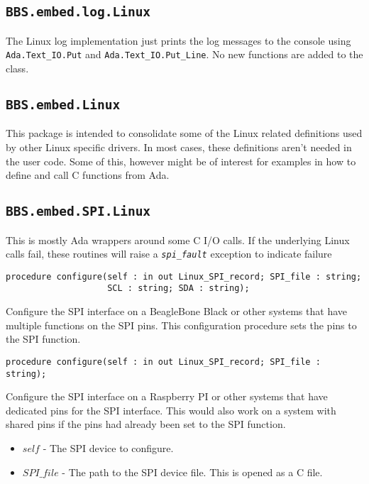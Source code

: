 \documentclass[10pt, openany]{book}
\newcommand{\indexfunc}[1]{\index[func]{#1}}
\newcommand{\package}[1]{\texttt{#1}}
\newcommand{\function}[1]{\texttt{#1}}
\newcommand{\constant}[1]{\emph{\texttt{#1}}}
\newcommand{\comment}[1]{{\color{red}{#1}}}
\begin{document}
\subsection{\package{BBS.embed.log.Linux}}
The Linux log implementation just prints the log messages to the console using \function{Ada.Text\_IO.Put} and \function{Ada.Text\_IO.Put\_Line}.  No new functions are added to the class.

\subsection{\package{BBS.embed.Linux}}
This package is intended to consolidate some of the Linux related definitions used by other Linux specific drivers.  In most cases, these definitions aren't needed in the user code.  Some of this, however might be of interest for examples in how to define and call C functions from Ada.

\subsection{\package{BBS.embed.SPI.Linux}}
This is mostly Ada wrappers around some C I/O calls.  If the underlying Linux calls fail, these routines will raise a \constant{spi\_fault} exception to indicate failure

\begin{lstlisting}
procedure configure(self : in out Linux_SPI_record; SPI_file : string;
                    SCL : string; SDA : string);
\end{lstlisting}
\indexfunc{configure}
Configure the SPI interface on a BeagleBone Black or other systems that have multiple functions on the SPI pins.  This configuration procedure sets the pins to the SPI function.

\comment{This function is not yet implemented.  Do not attempt to use.}
\begin{lstlisting}
procedure configure(self : in out Linux_SPI_record; SPI_file : string);
\end{lstlisting}
\indexfunc{configure}
Configure the SPI interface on a Raspberry PI or other systems that have dedicated pins for the SPI interface.  This would also work on a system with shared pins if the pins had already been set to the SPI function.
\begin{itemize}
  \item $self$ - The SPI device to configure.
  \item $SPI\_file$ - The path to the SPI device file.  This is opened as a C file.
\end{itemize}
\end{document}
